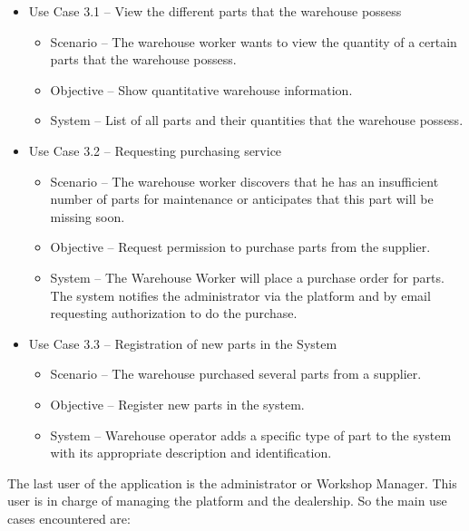 \begin{itemize}
  \item Use Case 3.1 – View the different parts that the warehouse possess
  \begin{itemize}
    \item Scenario – The warehouse worker wants to view the quantity of a certain parts that the warehouse possess.
    \item Objective – Show quantitative warehouse information.
    \item System – List of all parts and their quantities that the warehouse possess. 
  \end{itemize}
  \item Use Case 3.2 – Requesting purchasing service 
  \begin{itemize}
    \item Scenario – The warehouse worker discovers that he has an insufficient number of parts for maintenance or anticipates that this part will be missing soon.
    \item Objective – Request permission to purchase parts from the supplier.
    \item System – The Warehouse Worker will place a purchase order for parts. The system notifies the administrator via the platform and by email requesting authorization to do the purchase. 
  \end{itemize}
  \item Use Case 3.3 – Registration of new parts in the System
  \begin{itemize}
    \item Scenario – The warehouse purchased several parts from a supplier.
    \item Objective – Register new parts in the system.
    \item System – Warehouse operator adds a specific type of part to the system with its appropriate description and identification.
  \end{itemize}
\end{itemize}
\hfill \break

The last user of the application is the administrator or Workshop Manager. This user is in charge of managing the platform and the dealership. So the main use cases encountered are:

